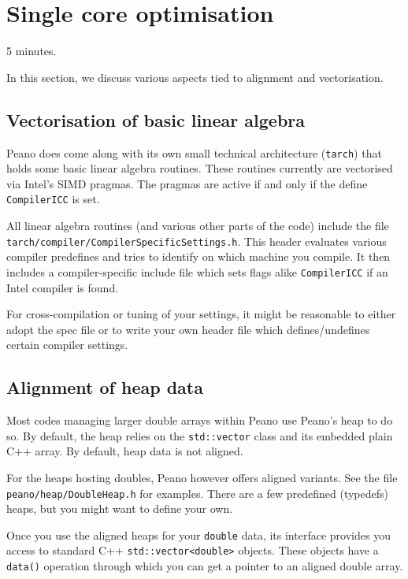\section{Single core optimisation}

\chapterDescription
  {
    5 minutes.
  }
  {
  }


In this section, we discuss various aspects tied to alignment and vectorisation. 


\subsection{Vectorisation of basic linear algebra}

Peano does come along with its own small technical architecture (\texttt{tarch})
that holds some basic linear algebra routines. These routines currently are
vectorised via Intel's SIMD pragmas. The pragmas are active if and only if the
define \texttt{CompilerICC} is set. 

All linear algebra routines (and various other parts of the code) include the
file \linebreak
\texttt{tarch/compiler/CompilerSpecificSettings.h}.
This header evaluates various compiler predefines and tries to identify on which
machine you compile.
It then includes a compiler-specific include file which sets flags alike 
\texttt{CompilerICC} if an Intel compiler is found.

For cross-compilation or tuning of your settings, it might be reasonable to
either adopt the spec file or to write your own header file which
defines/undefines certain compiler settings.


\subsection{Alignment of heap data}

Most codes managing larger double arrays within Peano use Peano's heap to do so. 
By default, the heap relies on the \texttt{std::vector} class and its embedded 
plain C++ array. 
By default, heap data is not aligned.


For the heaps hosting doubles, Peano however offers aligned variants. See the
file \linebreak
\texttt{peano/heap/DoubleHeap.h} for examples. 
There are a few predefined (typedefs) heaps, but you might want to define your
own.


Once you use the aligned heaps for your \texttt{double} data, its interface
provides you access to standard C++ \texttt{std::vector<double>} objects.
These objects have a \texttt{data()} operation through which you can get a 
pointer to an aligned double array.


